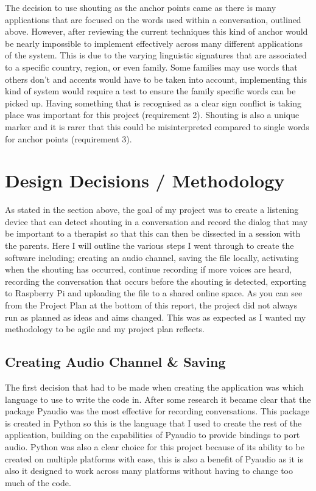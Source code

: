 \documentclass[a4paper,11pt]{report}
\begin{document}
The decision to use shouting as the anchor points came as there is many applications that are focused on the words used within a conversation, outlined above. However, after reviewing the current techniques this kind of anchor would be nearly impossible to implement effectively across many different applications of the system. This is due to the varying linguistic signatures that are associated to a specific country, region, or even family. Some families may use words that others don’t and accents would have to be taken into account, implementing this kind of system would require a test to ensure the family specific words can be picked up. Having something that is recognised as a clear sign conflict is taking place was important for this project (requirement 2). Shouting is also a unique marker and it is rarer that this could be misinterpreted compared to single words for anchor points (requirement 3).

\section{Design Decisions / Methodology}
As stated in the section above, the goal of my project was to create a listening device that can detect shouting in a conversation and record the dialog that may be important to a therapist so that this can then be dissected in a session with the parents. Here I will outline the various steps I went through to create the software including; creating an audio channel, saving the file locally, activating when the shouting has occurred, continue recording if more voices are heard, recording the conversation that occurs before the shouting is detected, exporting to Raspberry Pi and uploading the file to a shared online space. As you can see from the Project Plan at the bottom of this report, the project did not always run as planned as ideas and aims changed. This was as expected as I wanted my methodology to be agile and my project plan reflects.

\subsection{Creating Audio Channel \& Saving}
The first decision that had to be made when creating the application was which language to use to write the code in. After some research it became clear that the package Pyaudio was the most effective for recording conversations. This package is created in Python so this is the language that I used to create the rest of the application, building on the capabilities of Pyaudio to provide bindings to port audio. Python was also a clear choice for this project because of its ability to be created on multiple platforms with ease, this is also a benefit of Pyaudio as it is also it designed to work across many platforms without having to change too much of the code.\\
 
\end{document}
